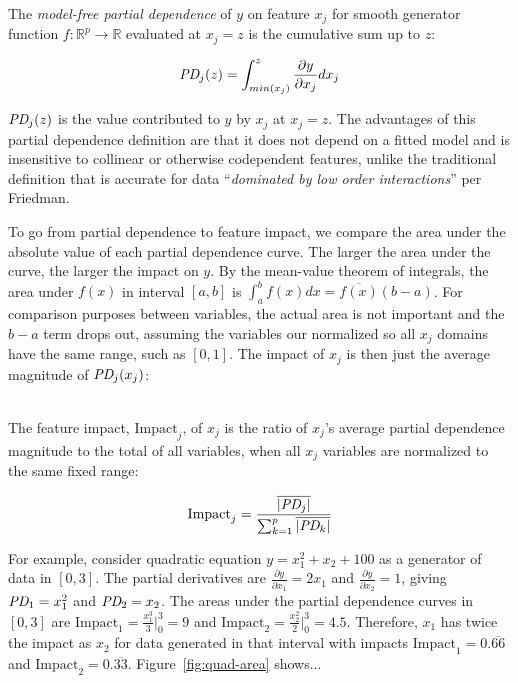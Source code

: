 \documentclass[11pt]{article}
\newcommand{\figref}[1]{Figure~\ref{#1}}
\newcommand{\Imp}{\text{Impact}}
\begin{document}
~\\
 The {\em model-free partial dependence} of $y$ on feature $x_j$ for smooth generator function $f:\mathbb{R}^{p} \rightarrow \mathbb{R}$ evaluated at $x_j = z$ is the cumulative sum up to $z$:

\begin{equation}\label{eq:pd}
\text{\it PD}_j(z) = \int_{min(x_j)}^z \frac{\partial y}{\partial x_j} dx_j
\end{equation}

$\text{\it PD}_j(z)$ is the value contributed to $y$ by $x_j$ at $x_j = z$. The advantages of this partial dependence definition are that it does not depend on a fitted model and is insensitive to collinear or otherwise codependent features, unlike the traditional definition that is accurate for data ``{\em dominated by low order interactions}'' per Friedman.  

To go from partial dependence to feature impact, we compare the area under the absolute value of each partial dependence curve. The larger the area under the curve, the larger the impact on $y$.   By the mean-value theorem of integrals, the area under $f(x)$ in interval $[a,b]$ is $\int_{a}^{b} f(x) dx = \overline{f(x)}(b-a)$.  For comparison purposes between variables, the actual area is not important and the $b-a$ term drops out, assuming the variables our normalized so all $x_j$ domains have the same range, such as $[0,1]$. The impact of $x_j$ is then just the average magnitude of $\text{\it PD}_j(x_j)$:

~\\
 The feature impact, $\Imp_j$, of $x_j$ is the ratio of $x_j$'s average partial dependence magnitude to the total of all variables, when all $x_j$ variables are normalized to the same fixed range:

\begin{equation}\label{eq:Epd2a}
\Imp_j = \frac{\overline{|\text{\it PD}_j|}}{\sum_{k=1}^p \overline{|\text{\it PD}_k|}}
\end{equation}

\noindent For example, consider quadratic equation $y = x_1^2 + x_2 + 100$ as a generator of data in $[0,3]$. The partial derivatives are $\frac{\partial y}{\partial x_1} = 2 x_1$ and $\frac{\partial y}{\partial x_2} = 1$, giving $\text{\it PD}_1 = x_1^2$ and $\text{\it PD}_2 = x_2$. The areas under the partial dependence curves in $[0,3]$ are $\Imp_1 = \frac{x_1^3}{3} \big |_0^3 = 9$ and $\Imp_2 = \frac{x_2^2}{2} \big |_0^3 = 4.5$.   Therefore, $x_1$ has twice the impact as $x_2$ for data generated in that interval with impacts $\Imp_1 = 0.\overline{66}$ and $\Imp_2 = 0.\overline{33}$. \figref{fig:quad-area} shows...
\end{document}

